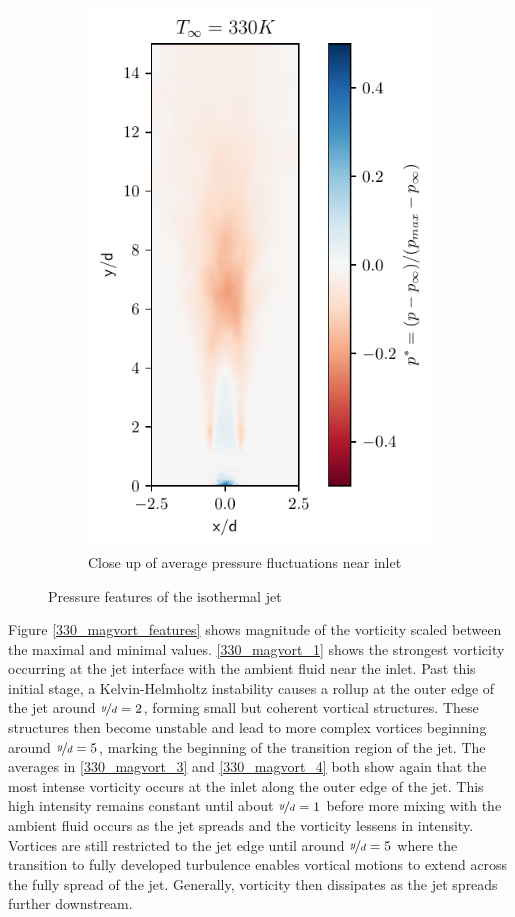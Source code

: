 \begin{figure}[htbp!]
\begin{subfigure}{0.25\textwidth}
	\includegraphics[scale=.65]{figures/Plots/vertical/330/pressure_scaled_vert_avg_330_zoom.pdf}
	\caption{Close up of average pressure fluctuations near inlet} \label{330_pressure_4}
\end{subfigure}
\caption{Pressure features of the isothermal jet}
\label{330_pressure_features}
\end{figure}

Figure \ref{330_magvort_features} shows magnitude of the vorticity scaled between the maximal and minimal values. \ref{330_magvort_1} shows the strongest vorticity occurring at the jet interface with the ambient fluid near the inlet. Past this initial stage, a Kelvin-Helmholtz instability causes a rollup at the outer edge of the jet around $\nicefrac{y}{d} = 2$, forming small but coherent vortical structures. These structures then become unstable and lead to more complex vortices beginning around $\nicefrac{y}{d}= 5$, marking the beginning of the transition region of the jet. The averages in \ref{330_magvort_3} and \ref{330_magvort_4} both show again that the most intense vorticity occurs at the inlet along the outer edge of the jet. This high intensity remains constant until about $\nicefrac{y}{d}=1$ before more mixing with the ambient fluid occurs as the jet spreads and the vorticity lessens in intensity. Vortices are still restricted to the jet edge until around $\nicefrac{y}{d} = 5$ where the transition to fully developed turbulence enables vortical motions to extend across the fully spread of the jet. Generally, vorticity then dissipates as the jet spreads further downstream.

